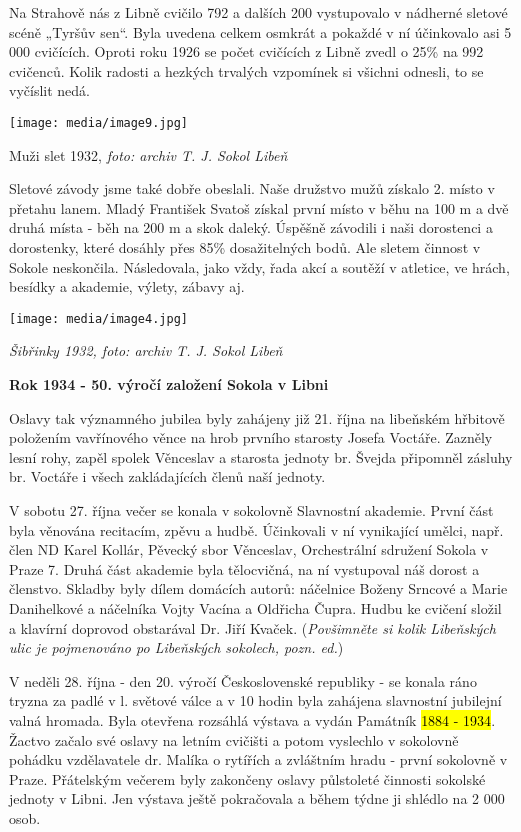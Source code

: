 Na Strahově nás z Libně cvičilo 792 a dalších 200 vystupovalo v nádherné
sletové scéně „Tyršův sen``. Byla uvedena celkem osmkrát a pokaždé v ní
účinkovalo asi 5 000 cvičících. Oproti roku 1926 se počet cvičících z
Libně zvedl o 25\% na 992 cvičenců. Kolik radosti a hezkých trvalých
vzpomínek si všichni odnesli, to se vyčíslit nedá.

\texttt{[image: media/image9.jpg]}

Muži slet 1932, \emph{foto: archiv T. J. Sokol Libeň}

Sletové závody jsme také dobře obeslali. Naše družstvo mužů získalo 2.
místo v přetahu lanem. Mladý František Svatoš získal první místo v běhu
na 100 m a dvě druhá místa - běh na 200 m a skok daleký. Úspěšně
závodili i naši dorostenci a dorostenky, které dosáhly přes 85\%
dosažitelných bodů. Ale sletem činnost v Sokole neskončila. Následovala,
jako vždy, řada akcí a soutěží v atletice, ve hrách, besídky a akademie,
výlety, zábavy aj.

\texttt{[image: media/image4.jpg]}

\emph{Šibřinky 1932, foto: archiv T. J. Sokol Libeň}

\textbf{Rok 1934 - 50. výročí založení Sokola v Libni}

Oslavy tak významného jubilea byly zahájeny již 21. října na libeňském
hřbitově položením vavřínového věnce na hrob prvního starosty Josefa
Voctáře. Zazněly lesní rohy, zapěl spolek Věnceslav a starosta jednoty
br. Švejda připomněl zásluhy br. Voctáře i všech zakládajících členů
naší jednoty.

V sobotu 27. října večer se konala v sokolovně Slavnostní akademie.
První část byla věnována recitacím, zpěvu a hudbě. Účinkovali v ní
vynikající umělci, např. člen ND Karel Kollár, Pěvecký sbor Věnceslav,
Orchestrální sdružení Sokola v Praze 7. Druhá část akademie byla
tělocvičná, na ní vystupoval náš dorost a členstvo. Skladby byly dílem
domácích autorů: náčelnice Boženy Srncové a Marie Danihelkové a
náčelníka Vojty Vacína a Oldřicha Čupra. Hudbu ke cvičení složil a
klavírní doprovod obstarával Dr. Jiří Kvaček. (\emph{Povšimněte si kolik
Libeňských ulic je pojmenováno po Libeňských sokolech, pozn. ed.})

V neděli 28. října - den 20. výročí Československé republiky - se konala
ráno tryzna za padlé v l. světové válce a v 10 hodin byla zahájena
slavnostní jubilejní valná hromada. Byla otevřena rozsáhlá výstava a
vydán Památník \hl{1884 - ⁠⁠⁠⁠⁠⁠1934}. Žactvo začalo své oslavy na letním
cvičišti a potom vyslechlo v sokolovně pohádku vzdělavatele dr. Malíka o
rytířích a zvláštním hradu - první sokolovně v Praze. Přátelským večerem
byly zakončeny oslavy půlstoleté činnosti sokolské jednoty v Libni. Jen
výstava ještě pokračovala a během týdne ji shlédlo na 2 000 osob.

